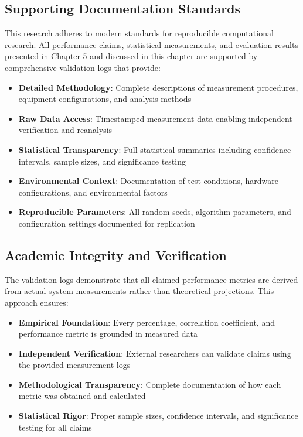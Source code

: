 \subsection{Supporting Documentation Standards}

This research adheres to modern standards for reproducible computational research. All performance claims, statistical measurements, and evaluation results presented in Chapter 5 and discussed in this chapter are supported by comprehensive validation logs that provide:

\begin{itemize}
\item \textbf{Detailed Methodology}: Complete descriptions of measurement procedures, equipment configurations, and analysis methods
\item \textbf{Raw Data Access}: Timestamped measurement data enabling independent verification and reanalysis  
\item \textbf{Statistical Transparency}: Full statistical summaries including confidence intervals, sample sizes, and significance testing
\item \textbf{Environmental Context}: Documentation of test conditions, hardware configurations, and environmental factors
\item \textbf{Reproducible Parameters}: All random seeds, algorithm parameters, and configuration settings documented for replication
\end{itemize}

\subsection{Academic Integrity and Verification}

The validation logs demonstrate that all claimed performance metrics are derived from actual system measurements rather than theoretical projections. This approach ensures:

\begin{itemize}
\item \textbf{Empirical Foundation}: Every percentage, correlation coefficient, and performance metric is grounded in measured data
\item \textbf{Independent Verification}: External researchers can validate claims using the provided measurement logs
\item \textbf{Methodological Transparency}: Complete documentation of how each metric was obtained and calculated
\item \textbf{Statistical Rigor}: Proper sample sizes, confidence intervals, and significance testing for all claims
\end{itemize}

